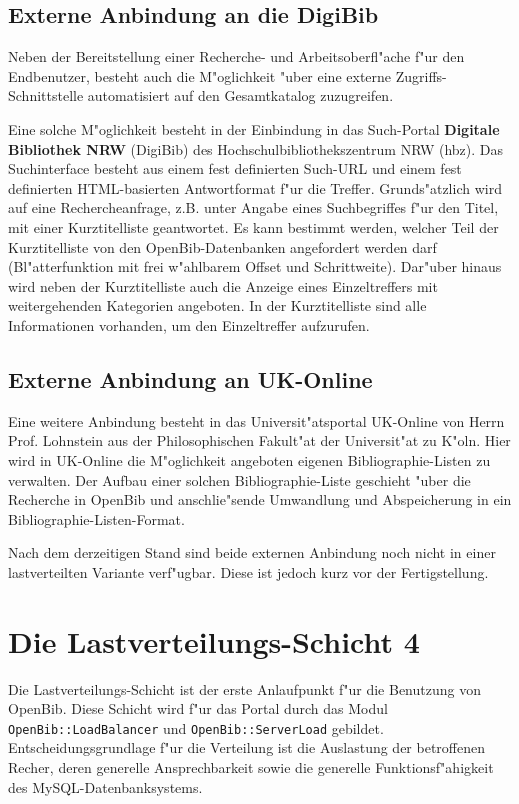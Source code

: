 \documentclass[11pt, twoside, a4paper, BCOR8mm, DIV12, bibtotoc,idxtotoc]{scrbook}
\begin{document}
\subsection{Externe Anbindung an die DigiBib}

Neben der Bereitstellung einer Recherche- und Arbeitsoberfl"ache f"ur
den Endbenutzer, besteht auch die M"oglichkeit "uber eine externe
Zugriffs-Schnittstelle automatisiert auf den Gesamtkatalog
zuzugreifen.

Eine solche M"oglichkeit besteht in der Einbindung in das Such-Portal
\textbf{Digitale Bibliothek NRW} (DigiBib) des
Hoch\-schul\-bibliotheks\-zentrum NRW (hbz). Das Suchinterface besteht aus
einem fest definierten Such-URL und einem fest definierten
HTML-basierten Antwortformat f"ur die Treffer. Grunds"atzlich wird auf
eine Rechercheanfrage, z.B. unter Angabe eines Suchbegriffes f"ur den
Titel, mit einer Kurztitelliste geantwortet. Es kann bestimmt werden,
welcher Teil der Kurztitelliste von den OpenBib-Daten\-banken
angefordert werden darf (Bl"atterfunktion mit frei w"ahlbarem Offset
und Schrittweite). Dar"uber hinaus wird neben der Kurztitelliste auch
die Anzeige eines Einzeltreffers mit weiter\-gehen\-den Kategorien
angeboten. In der Kurztitelliste sind alle Informationen vorhanden, um
den Einzeltreffer aufzurufen.

\subsection{Externe Anbindung an UK-Online}

Eine weitere Anbindung besteht in das Universit"atsportal UK-Online
von Herrn Prof. Lohnstein aus der Philosophischen Fakult"at der
Universit"at zu K"oln. Hier wird in UK-Online die M"oglichkeit
angeboten eigenen Bibliographie-Listen zu verwalten. Der Aufbau einer
solchen Bibliographie-Liste geschieht "uber die Recherche in OpenBib
und anschlie"sende Umwandlung und Ab\-spei\-cherung in ein
Bibliographie-Listen-Format.

Nach dem derzeitigen Stand sind beide externen Anbindung noch nicht in
einer lastverteilten Variante verf"ugbar. Diese ist jedoch kurz vor
der Fertigstellung.

\section{Die Lastverteilungs-Schicht 4}

Die Lastverteilungs-Schicht ist der erste Anlaufpunkt f"ur die
Benutzung von OpenBib. Diese Schicht wird f"ur das Portal durch das
Modul \texttt{OpenBib::LoadBalancer} und \texttt{OpenBib::ServerLoad} gebildet.
Entscheidungsgrundlage f"ur die Verteilung ist die Auslastung der
betroffenen Recher, deren generelle Ansprechbarkeit sowie die
generelle Funktionsf"ahigkeit des MySQL-Daten\-bank\-sys\-tems.
\end{document}

